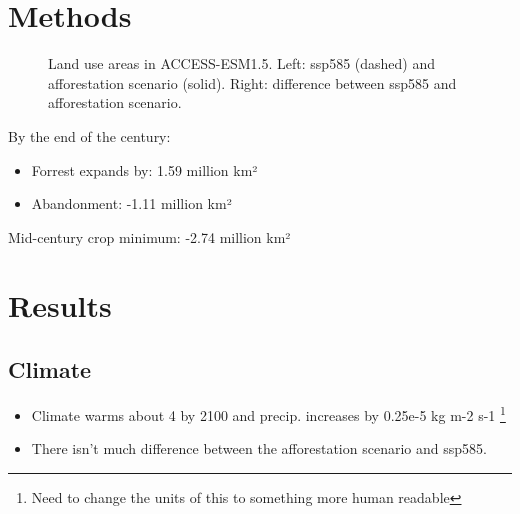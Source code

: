 \documentclass[]{article}
\begin{document}
\section{Methods}

\begin{figure}[!h]
    \centering
    \begin{subfigure}[b]{0.45\linewidth}
        
    \end{subfigure}
    \begin{subfigure}[b]{0.45\linewidth}
        
    \end{subfigure}
    \caption{Land use areas in ACCESS-ESM1.5. Left: ssp585 (dashed) and afforestation scenario (solid). Right: difference between ssp585 and afforestation scenario.}
    \label{fig:land_use}
\end{figure}

By the end of the century:
\begin{itemize}
    \item Forrest expands by: 1.59 million km²
    \item Abandonment: -1.11 million km²
\end{itemize}

Mid-century crop minimum: -2.74 million km²

\section{Results}

\subsection{Climate}

\begin{itemize}
    \item Climate warms about 4 \textcelsius{} by 2100 and precip. increases by 0.25e-5 kg m-2 s-1 \footnote{Need to change the units of this to something more human readable}

    \item There isn't much difference between the afforestation scenario and ssp585.
\end{itemize}
\end{document}
